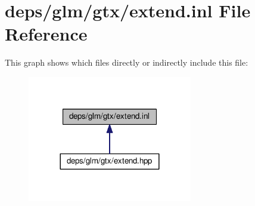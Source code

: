 \hypertarget{extend_8inl}{}\section{deps/glm/gtx/extend.inl File Reference}
\label{extend_8inl}
This graph shows which files directly or indirectly include this file\+:
\nopagebreak
\begin{figure}[H]
\begin{center}
\leavevmode
\includegraphics[width=204pt]{d5/d0b/extend_8inl__dep__incl}
\end{center}
\end{figure}
